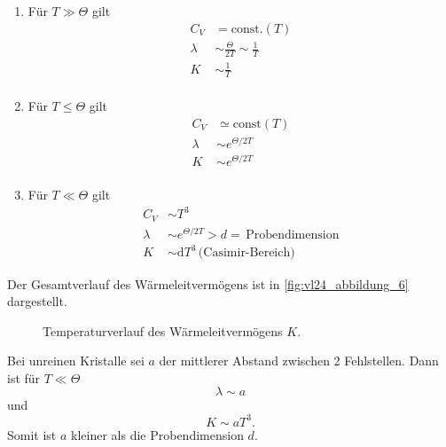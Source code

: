 	\begin{enumerate}
		\item Für $T\gg\Theta$ gilt
			$$
			\begin{aligned}
				C_{V} &= \text{const.}(T) \\
				\lambda &\sim \frac{\Theta}{2T} \sim \frac{1}{T} \\
				K &\sim \frac{1}{T} \\
			\end{aligned}
			$$ 
		\item Für $T \le \Theta$ gilt
			$$
			\begin{aligned}
				C_{V} &\simeq \text{const}(T) \\
				\lambda &\sim e^{\Theta /2T}\\
				K &\sim e^{\Theta/2T}\\
			\end{aligned}
			$$ 
		\item Für $T\ll\Theta$ gilt
			$$
			\begin{aligned}
				C_{V} &\sim T^3 \\
				\lambda &\sim e^{\Theta /2T} > d = \, \text{Probendimension}\\
				K &\sim \mathrm{d} T^3 \, \text{(Casimir-Bereich)}
			\end{aligned}
			$$ 
	\end{enumerate}
	Der Gesamtverlauf des Wärmeleitvermögens ist in \autoref{fig:vl24_abbildung_6} dargestellt.

	\begin{figure}[H]
		\centering
		\caption{Temperaturverlauf des Wärmeleitvermögens $K$.}
		\label{fig:vl24_abbildung_6}
	\end{figure}

	Bei unreinen Kristalle sei $a$ der mittlerer Abstand zwischen 2 Fehlstellen. Dann ist für $T\ll \Theta$ 
	$$\lambda \sim a$$
	und
	$$K \sim aT^3.$$ 
	Somit ist $a$ kleiner als die Probendimension $d$.
	
